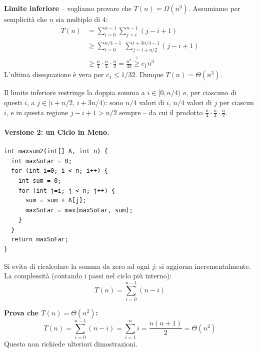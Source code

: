 \documentclass[12pt, a4paper]{article}
\begin{document}
\textbf{Limite inferiore} -- vogliamo provare che $T(n)=\Omega(n^3)$. Assumiamo per semplicità che $n$ sia multiplo di $4$:
\begin{align*}
T(n) &= \sum_{i=0}^{n-1}\sum_{j=i}^{n-1}(j-i+1) \\
     &\ge \sum_{i=0}^{n/4-1}\ \sum_{j=i+n/2}^{i+3n/4-1}(j-i+1) \\
     &\ge \frac{n}{4}\cdot\frac{n}{4}\cdot\frac{n}{2} = \frac{n^3}{32} \overset{?}{\ge} c_1n^3
\end{align*}
L'ultima disequazione è vera per $c_1\le 1/32$. Dunque $T(n)=\Theta(n^3)$.

\begin{tcolorbox}[colback=lightergray!5, colframe=tocsubsec, title=\textbf{Nota (lettura della dimostrazione)}]
Il limite inferiore restringe la doppia somma a $i\in[0,n/4)$ e, per ciascuno di questi $i$, a $j\in[i+n/2,\,i+3n/4)$: sono $n/4$ valori di $i$, $n/4$ valori di $j$ per ciascun $i$, e in questa regione $j-i+1 > n/2$ sempre -- da cui il prodotto $\frac{n}{4}\cdot\frac{n}{4}\cdot\frac{n}{2}$.
\end{tcolorbox}

\paragraph{Versione 2: un Ciclo in Meno.}
\begin{verbatim}
int maxsum2(int[] A, int n) {
  int maxSoFar = 0;
  for (int i=0; i < n; i++) {
    int sum = 0;
    for (int j=i; j < n; j++) {
      sum = sum + A[j];
      maxSoFar = max(maxSoFar, sum);
    }
  }
  return maxSoFar;
}
\end{verbatim}
Si evita di ricalcolare la somma da zero ad ogni $j$: si aggiorna incrementalmente. La complessità (contando i passi nel ciclo più interno):
$$T(n) = \sum_{i=0}^{n-1}(n-i)$$

\textbf{Prova che $T(n)=\Theta(n^2)$:}
$$T(n) = \sum_{i=0}^{n-1}(n-i) = \sum_{i=1}^{n} i = \frac{n(n+1)}{2} = \Theta(n^2)$$
Questo non richiede ulteriori dimostrazioni.
\end{document}
